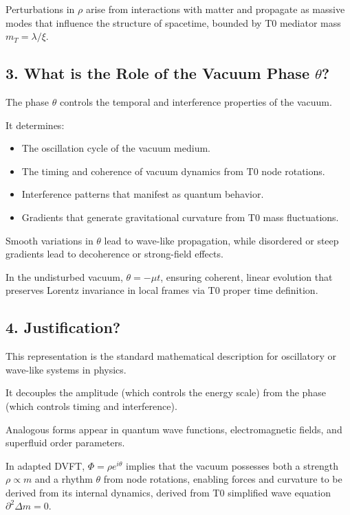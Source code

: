 	Perturbations in $\rho$ arise from interactions with matter and propagate as massive modes that influence the structure of spacetime, bounded by T0 mediator mass $m_T = \lambda / \xi$.
	
	\subsection{3. What is the Role of the Vacuum Phase $\theta$?}
	
	The phase $\theta$ controls the temporal and interference properties of the vacuum.
	
	It determines:
	\begin{itemize}
		\item The oscillation cycle of the vacuum medium.
		\item The timing and coherence of vacuum dynamics from T0 node rotations.
		\item Interference patterns that manifest as quantum behavior.
		\item Gradients that generate gravitational curvature from T0 mass fluctuations.
	\end{itemize}
	
	Smooth variations in $\theta$ lead to wave-like propagation, while disordered or steep gradients lead to decoherence or strong-field effects.
	
	In the undisturbed vacuum, $\theta = -\mu t$, ensuring coherent, linear evolution that preserves Lorentz invariance in local frames via T0 proper time definition.
	
	\subsection{4. Justification?}
	
	This representation is the standard mathematical description for oscillatory or wave-like systems in physics.
	
	It decouples the amplitude (which controls the energy scale) from the phase (which controls timing and interference).
	
	Analogous forms appear in quantum wave functions, electromagnetic fields, and superfluid order parameters.
	
	In adapted DVFT, $\Phi = \rho e^{i\theta}$ implies that the vacuum possesses both a strength $\rho \propto m$ and a rhythm $\theta$ from node rotations, enabling forces and curvature to be derived from its internal dynamics, derived from T0 simplified wave equation $\partial^2 \Delta m = 0$.
	
